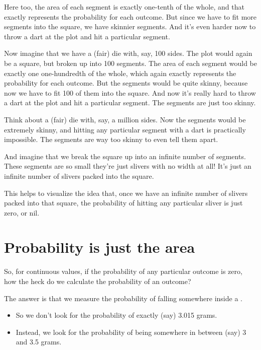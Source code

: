 \documentclass[../../../main.tex]{subfiles}
\begin{document}
Here too, the area of each segment is exactly one-tenth of the whole, and that exactly represents the probability for each outcome. But since we have to fit more segments into the square, we have skinnier segments. And it's even harder now to throw a dart at the plot and hit a particular segment.

Now imagine that we have a (fair) die with, say, 100 sides. The plot would again be a square, but broken up into 100 segments. The area of each segment would be exactly one one-hundredth of the whole, which again exactly represents the probability for each outcome. But the segments would be quite skinny, because now we have to fit 100 of them into the square. And now it's really hard to throw a dart at the plot and hit a particular segment. The segments are just too skinny.

Think about a (fair) die with, say, a million sides. Now the segments would be extremely skinny, and hitting any particular segment with a dart is practically impossible. The segments are way too skinny to even tell them apart.

And imagine that we break the square up into an infinite number of segments. These segments are so small they're just slivers with no width at all! It's just an infinite number of slivers packed into the square.

This helps to visualize the idea that, once we have an infinite number of slivers packed into that square, the probability of hitting any particular sliver is just zero, or nil.



\section{Probability is just the area}

So, for continuous values, if the probability of any particular outcome is zero, how the heck do we calculate the probability of an outcome? 

The answer is that we measure the probability of falling somewhere inside a . 

\begin{itemize}
  \item So we don't look for the probability of exactly (say) 3.015 grams. 
  \item Instead, we look for the probability of being somewhere in between (say) 3 and 3.5 grams.
\end{itemize}
\end{document}
